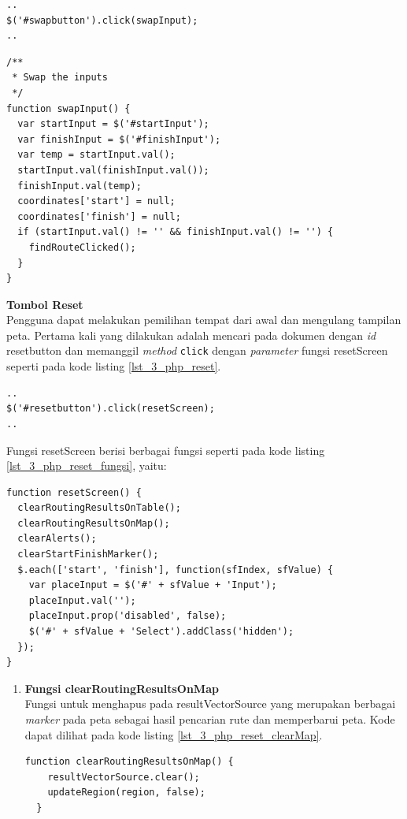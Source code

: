 \documentclass[a4paper,twoside]{article}
\begin{document}
\begin{enumerate}
\begin{lstlisting}[caption=\textit{Method} untuk memanggil fungsi JavaScript ketika tombol \textit{swap} ditekan ,label = {lst_3_php_swap}]
..
$('#swapbutton').click(swapInput);
..
\end{lstlisting}

\begin{lstlisting}[caption=Fungsi JavaScript untuk menukar isi \textit{textfield} tempat asal dan tujuan ,label = {lst_3_php_swap_fungsi}]  
/**
 * Swap the inputs
 */
function swapInput() {
  var startInput = $('#startInput');
  var finishInput = $('#finishInput');
  var temp = startInput.val();
  startInput.val(finishInput.val());
  finishInput.val(temp);
  coordinates['start'] = null;
  coordinates['finish'] = null;
  if (startInput.val() != '' && finishInput.val() != '') {
    findRouteClicked();
  }
}
\end{lstlisting}

\textbf{Tombol Reset}\\
Pengguna dapat melakukan pemilihan tempat dari awal dan mengulang tampilan peta. Pertama kali yang dilakukan adalah mencari pada dokumen dengan \textit{id} resetbutton dan memanggil \textit{method} \verb!click! dengan \textit{parameter} fungsi resetScreen seperti pada kode listing \ref{lst_3_php_reset}. 

\begin{lstlisting}[caption=\textit{Method} untuk memanggil fungsi JavaScript ketika tombol \textit{reset} ditekan ,label = {lst_3_php_reset}]
..
$('#resetbutton').click(resetScreen);
..
\end{lstlisting}

Fungsi resetScreen berisi berbagai fungsi seperti pada kode listing \ref{lst_3_php_reset_fungsi}, yaitu:

\begin{lstlisting}[caption=Fungsi JavaScript resetScreen ,label = {lst_3_php_reset_fungsi}]  
function resetScreen() {
  clearRoutingResultsOnTable();
  clearRoutingResultsOnMap();
  clearAlerts();
  clearStartFinishMarker();
  $.each(['start', 'finish'], function(sfIndex, sfValue) {
    var placeInput = $('#' + sfValue + 'Input');
    placeInput.val('');  
    placeInput.prop('disabled', false);
    $('#' + sfValue + 'Select').addClass('hidden');
  });
}
\end{lstlisting}

\begin{enumerate}
  \item \textbf{Fungsi clearRoutingResultsOnMap}\\
  Fungsi untuk menghapus pada resultVectorSource yang merupakan berbagai \textit{marker} pada peta sebagai hasil pencarian rute dan memperbarui peta. Kode dapat dilihat pada kode listing \ref{lst_3_php_reset_clearMap}.
  \begin{lstlisting}[caption=Fungsi JavaScript untuk menghapus hasil pencarian rute pada peta ,label = {lst_3_php_reset_clearMap}]
  function clearRoutingResultsOnMap() {
    resultVectorSource.clear();
    updateRegion(region, false);
  }
  \end{lstlisting}
  

\end{enumerate}
\end{enumerate}
\end{document}
